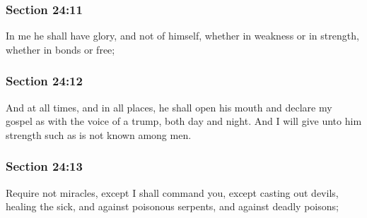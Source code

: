	\subsubsection{Section 24:11} %
		\label{DC24-11}

		In me he shall have glory, and not of himself, whether in weakness or in strength, whether in bonds or free;


	\subsubsection{Section 24:12} %
		\label{DC24-12}

		And at all times, and in all places, he shall open his mouth and declare my gospel as with the voice of a trump, both day and night. And I will give unto him strength such as is not known among men.


	\subsubsection{Section 24:13} %
		\label{DC24-13}

		Require not miracles, except I shall command you, except casting out devils, healing the sick, and against poisonous serpents, and against deadly poisons;



